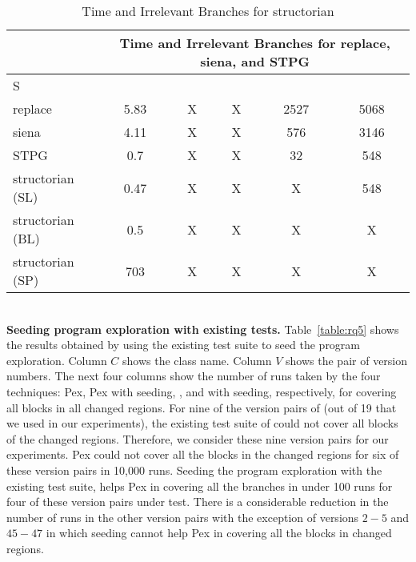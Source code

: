 \begin{table}
\begin{CodeOut}
\begin{center}
\caption {\label{table:all_time}\scriptsize{Time and Irrelevant Branches for structorian}}
\begin {tabular} {|l|c|c|c|c|c|}
\hline
&\multicolumn{5}{|c|}{Time and Irrelevant Branches for replace, siena, and STPG}\\ 
\hline
S &\CenterCell{$T_{static}(s)$}&\CenterCell{$T_{Pex}(s)$}&\CenterCell{$T_{eXp}(s)$} &\CenterCell{$B_{Irr}$}&\CenterCell{$B_{Tot}$}\\
\hline
replace&5.83&X&X&2527&5068\\
\hline
siena&4.11&X&X&576&3146\\
\hline
STPG&0.7&X&X&32&548\\
\hline
structorian (SL)&0.47&X&X&X&548\\
\hline
structorian (BL)&0.5&X&X&X&X\\
\hline
structorian (SP)&703&X&X&X&X\\
\hline

\end{tabular}
\end{center}
\end{CodeOut}
\vspace{- 0.4 in}
\end{table}
\\ \textbf{Seeding program exploration with existing tests.} Table~\ref{table:rq5} shows the results obtained by using the existing test suite to seed the program exploration. Column $C$ shows the class name. Column $V$ shows the pair of version numbers. The next four columns show the number of runs taken by the four techniques: Pex, Pex with seeding, , and  with seeding, respectively, for covering all blocks in all changed regions.
For nine of the version pairs of  (out of 19 that we used in our experiments), the existing test suite of  could not cover all blocks of the changed regions. Therefore, we consider these nine version pairs for our experiments.
Pex could not cover all the blocks in the changed regions for six of these version pairs in 10,000 runs. Seeding the program exploration with the existing test suite, helps Pex in covering all the branches in under 100 runs for four of these version pairs under test. There is a considerable reduction in the number of runs in the other version pairs with the exception of versions $2-5$ and $45-47$ in which seeding cannot help Pex in covering all the blocks in changed regions. 

